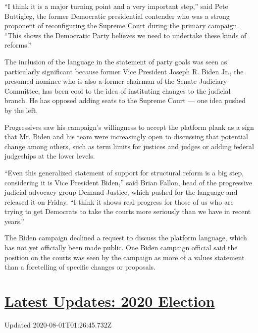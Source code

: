 ``I think it is a major turning point and a very important step,'' said
Pete Buttigieg, the former Democratic presidential contender who was a
strong proponent of reconfiguring the Supreme Court during the primary
campaign. ``This shows the Democratic Party believes we need to
undertake these kinds of reforms.''

The inclusion of the language in the statement of party goals was seen
as particularly significant because former Vice President Joseph R.
Biden Jr., the presumed nominee who is also a former chairman of the
Senate Judiciary Committee, has been cool to the idea of instituting
changes to the judicial branch. He has opposed adding seats to the
Supreme Court --- one idea pushed by the left.

Progressives saw his campaign's willingness to accept the platform plank
as a sign that Mr. Biden and his team were increasingly open to
discussing that potential change among others, such as term limits for
justices and judges or adding federal judgeships at the lower levels.

``Even this generalized statement of support for structural reform is a
big step, considering it is Vice President Biden,'' said Brian Fallon,
head of the progressive judicial advocacy group Demand Justice, which
pushed for the language and released it on Friday. ``I think it shows
real progress for those of us who are trying to get Democrats to take
the courts more seriously than we have in recent years.''

The Biden campaign declined a request to discuss the platform language,
which has not yet officially been made public. One Biden campaign
official said the position on the courts was seen by the campaign as
more of a values statement than a foretelling of specific changes or
proposals.

\hypertarget{latest-updates-2020-election}{%
\section{\texorpdfstring{\href{https://www.nytimes.com/2020/07/31/us/elections/biden-vs-trump.html?action=click\&pgtype=Article\&state=default\&region=MAIN_CONTENT_1\&context=storylines_live_updates}{Latest
Updates: 2020
Election}}{Latest Updates: 2020 Election}}\label{latest-updates-2020-election}}

Updated 2020-08-01T01:26:45.732Z

